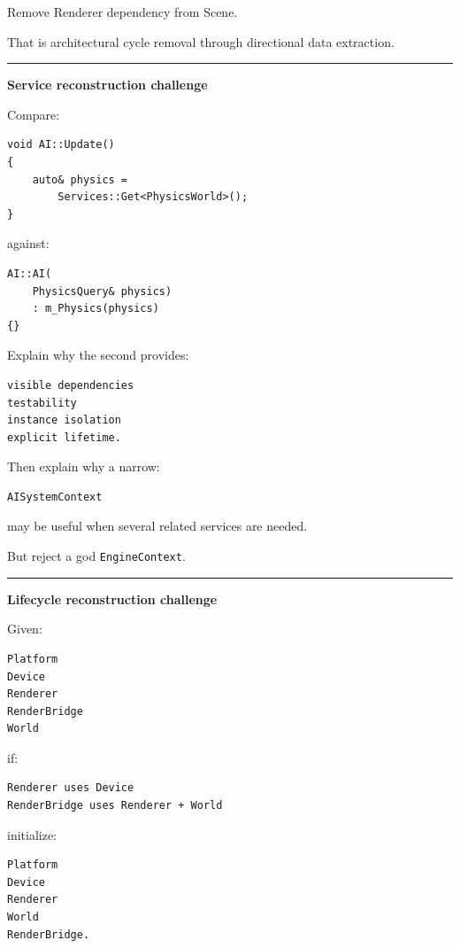 Remove Renderer dependency from Scene.

That is architectural cycle removal through directional data extraction.

\begin{center}\rule{0.5\linewidth}{0.5pt}\end{center}

\textbf{Service reconstruction challenge}

Compare:

\begin{verbatim}
void AI::Update()
{
    auto& physics =
        Services::Get<PhysicsWorld>();
}
\end{verbatim}

against:

\begin{verbatim}
AI::AI(
    PhysicsQuery& physics)
    : m_Physics(physics)
{}
\end{verbatim}

Explain why the second provides:

\begin{verbatim}
visible dependencies
testability
instance isolation
explicit lifetime.
\end{verbatim}

Then explain why a narrow:

\begin{verbatim}
AISystemContext
\end{verbatim}

may be useful when several related services are needed.

But reject a god \texttt{EngineContext}.

\begin{center}\rule{0.5\linewidth}{0.5pt}\end{center}

\textbf{Lifecycle reconstruction challenge}

Given:

\begin{verbatim}
Platform
Device
Renderer
RenderBridge
World
\end{verbatim}

if:

\begin{verbatim}
Renderer uses Device
RenderBridge uses Renderer + World
\end{verbatim}

initialize:

\begin{verbatim}
Platform
Device
Renderer
World
RenderBridge.
\end{verbatim}

